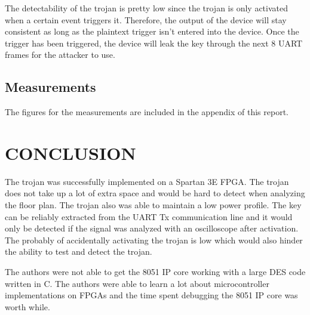 \documentclass[letterpaper, 10 pt, conference]{ieeeconf}  %
\begin{document}
The detectability of the trojan is pretty low since the trojan is only activated when a certain event triggers it. Therefore, the output of the device will stay consistent as long as the plaintext trigger isn't entered into the device. Once the trigger has been triggered, the device will leak the key through the next 8 UART frames for the attacker to use.

\subsection{Measurements} 



The figures for the measurements are included in the appendix of this report.

\section{CONCLUSION}

The trojan was successfully implemented on a Spartan 3E FPGA.  The trojan does not take up a lot of extra space and would be hard to detect when analyzing the floor plan.  The trojan also was able to maintain a low power profile.  The key can be reliably extracted from the UART Tx communication line and it would only be detected if the signal was analyzed with an oscilloscope after activation.  The probably of accidentally activating the trojan is low which would also hinder the ability to test and detect the trojan.

The authors were not able to get the 8051 IP core working with a large DES code written in C.  The authors were able to learn a lot about microcontroller implementations on FPGAs and the time spent debugging the 8051 IP core was worth while. 

\addtolength{\textheight}{-12cm}   %




\end{document}

